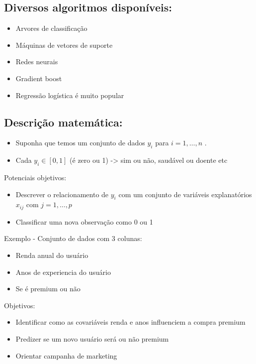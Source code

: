 \documentclass[
]{article}
\providecommand{\tightlist}{%
  \setlength{\itemsep}{0pt}\setlength{\parskip}{0pt}}
\begin{document}
\hypertarget{diversos-algoritmos-disponuxedveis}{%
\subsection{Diversos algoritmos
disponíveis:}\label{diversos-algoritmos-disponuxedveis}}

\begin{itemize}
\tightlist
\item
  Arvores de classificação
\item
  Máquinas de vetores de suporte
\item
  Redes neurais
\item
  Gradient boost
\item
  Regressão logística é muito popular
\end{itemize}

\hypertarget{descriuxe7uxe3o-matemuxe1tica}{%
\subsection{Descrição matemática:}\label{descriuxe7uxe3o-matemuxe1tica}}

\begin{itemize}
\tightlist
\item
  Suponha que temos um conjunto de dados \(y_{i}\) para \(i=1,…,n\) .
\item
  Cada \(y_{i} \in [0,1]\) (é zero ou 1) -\textgreater{} sim ou não,
  saudável ou doente etc
\end{itemize}

Potenciais objetivos:

\begin{itemize}
\tightlist
\item
  Descrever o relacionamento de \(y_{i}\) com um conjunto de variáveis
  explanatórios \(x_{ij}\) com \(j=1,…,p\)
\item
  Classificar uma nova observação como 0 ou 1
\end{itemize}

Exemplo - Conjunto de dados com 3 colunas:

\begin{itemize}
\tightlist
\item
  Renda anual do usuário
\item
  Anos de experiencia do usuário
\item
  Se é premium ou não
\end{itemize}

Objetivos:

\begin{itemize}
\tightlist
\item
  Identificar como as covariáveis renda e anos influenciem a compra
  premium
\item
  Predizer se um novo usuário será ou não premium
\item
  Orientar campanha de marketing
\end{itemize}
\end{document}
